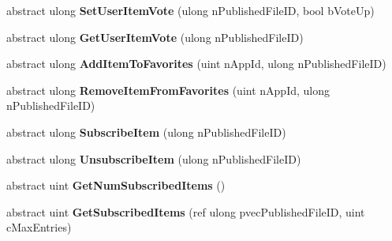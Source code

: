 \begin{DoxyCompactItemize}
\item 
\hypertarget{classValve_1_1Steamworks_1_1ISteamUGC_a33961ae12f529fca74760cda3121d90c}{}abstract ulong {\bfseries Set\+User\+Item\+Vote} (ulong n\+Published\+File\+I\+D, bool b\+Vote\+Up)\label{classValve_1_1Steamworks_1_1ISteamUGC_a33961ae12f529fca74760cda3121d90c}

\item 
\hypertarget{classValve_1_1Steamworks_1_1ISteamUGC_a14a5d58b24d5be46ac507a470d04ed71}{}abstract ulong {\bfseries Get\+User\+Item\+Vote} (ulong n\+Published\+File\+I\+D)\label{classValve_1_1Steamworks_1_1ISteamUGC_a14a5d58b24d5be46ac507a470d04ed71}

\item 
\hypertarget{classValve_1_1Steamworks_1_1ISteamUGC_af7e6516f9df9c739c9c50bfad657ed75}{}abstract ulong {\bfseries Add\+Item\+To\+Favorites} (uint n\+App\+Id, ulong n\+Published\+File\+I\+D)\label{classValve_1_1Steamworks_1_1ISteamUGC_af7e6516f9df9c739c9c50bfad657ed75}

\item 
\hypertarget{classValve_1_1Steamworks_1_1ISteamUGC_a32a3cc2c577b139aa6d8928246dd08eb}{}abstract ulong {\bfseries Remove\+Item\+From\+Favorites} (uint n\+App\+Id, ulong n\+Published\+File\+I\+D)\label{classValve_1_1Steamworks_1_1ISteamUGC_a32a3cc2c577b139aa6d8928246dd08eb}

\item 
\hypertarget{classValve_1_1Steamworks_1_1ISteamUGC_a8bd7bf644674a81fb669e9649b6b8e6d}{}abstract ulong {\bfseries Subscribe\+Item} (ulong n\+Published\+File\+I\+D)\label{classValve_1_1Steamworks_1_1ISteamUGC_a8bd7bf644674a81fb669e9649b6b8e6d}

\item 
\hypertarget{classValve_1_1Steamworks_1_1ISteamUGC_a645887aef82c1c3b81a589b9c539987d}{}abstract ulong {\bfseries Unsubscribe\+Item} (ulong n\+Published\+File\+I\+D)\label{classValve_1_1Steamworks_1_1ISteamUGC_a645887aef82c1c3b81a589b9c539987d}

\item 
\hypertarget{classValve_1_1Steamworks_1_1ISteamUGC_a2b37cba6583198b3182c013d53d5df5d}{}abstract uint {\bfseries Get\+Num\+Subscribed\+Items} ()\label{classValve_1_1Steamworks_1_1ISteamUGC_a2b37cba6583198b3182c013d53d5df5d}

\item 
\hypertarget{classValve_1_1Steamworks_1_1ISteamUGC_a7dc288f70f49c9e50aac1ba04098e755}{}abstract uint {\bfseries Get\+Subscribed\+Items} (ref ulong pvec\+Published\+File\+I\+D, uint c\+Max\+Entries)\label{classValve_1_1Steamworks_1_1ISteamUGC_a7dc288f70f49c9e50aac1ba04098e755}


\end{DoxyCompactItemize}
